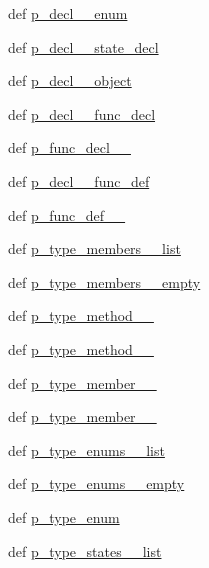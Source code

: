 \begin{DoxyCompactItemize}
def \hyperlink{classslicc_1_1parser_1_1SLICC_adcab24cfeebb754dc1256bf854e6feb7}{p\_\-decl\_\-\_\-enum}
\item 
def \hyperlink{classslicc_1_1parser_1_1SLICC_a18fd8cff26bef07652081e680b979709}{p\_\-decl\_\-\_\-state\_\-decl}
\item 
def \hyperlink{classslicc_1_1parser_1_1SLICC_ac5d6e1167568798c10875717aa01f18b}{p\_\-decl\_\-\_\-object}
\item 
def \hyperlink{classslicc_1_1parser_1_1SLICC_ad66627c6753ceb15be8ff36e20fcb0e1}{p\_\-decl\_\-\_\-func\_\-decl}
\item 
def \hyperlink{classslicc_1_1parser_1_1SLICC_afaf6fd2752bcbcfe7e4b38de1c128c99}{p\_\-func\_\-decl\_\-\_}
\item 
def \hyperlink{classslicc_1_1parser_1_1SLICC_a2f6325df13327674bd0ae4cc328bf0df}{p\_\-decl\_\-\_\-func\_\-def}
\item 
def \hyperlink{classslicc_1_1parser_1_1SLICC_a6b32df3ee60a0582f8efd9aa32d5ab60}{p\_\-func\_\-def\_\-\_}
\item 
def \hyperlink{classslicc_1_1parser_1_1SLICC_a8c3e9ea7893a66490263b229b8f1292b}{p\_\-type\_\-members\_\-\_\-list}
\item 
def \hyperlink{classslicc_1_1parser_1_1SLICC_a9184c0f6c2ca85dcd779db7b505176d2}{p\_\-type\_\-members\_\-\_\-empty}
\item 
def \hyperlink{classslicc_1_1parser_1_1SLICC_ab2ba9bf97cd7869bee363f09c4e777b3}{p\_\-type\_\-method\_\-\_}
\item 
def \hyperlink{classslicc_1_1parser_1_1SLICC_ad508836482d67540f8b3b5bba6461560}{p\_\-type\_\-method\_\-\_}
\item 
def \hyperlink{classslicc_1_1parser_1_1SLICC_ac6f9f3e8882575559628a5c9687438e6}{p\_\-type\_\-member\_\-\_}
\item 
def \hyperlink{classslicc_1_1parser_1_1SLICC_aa863c975771051b0c15dbb988b31ba83}{p\_\-type\_\-member\_\-\_}
\item 
def \hyperlink{classslicc_1_1parser_1_1SLICC_a777b7a832956d19030606b12ab13ec9a}{p\_\-type\_\-enums\_\-\_\-list}
\item 
def \hyperlink{classslicc_1_1parser_1_1SLICC_a980bb7bd9ac22437c10503b52799418c}{p\_\-type\_\-enums\_\-\_\-empty}
\item 
def \hyperlink{classslicc_1_1parser_1_1SLICC_ab484be4a5214a30ffab2a0e34dcdbca6}{p\_\-type\_\-enum}
\item 
def \hyperlink{classslicc_1_1parser_1_1SLICC_a69cd318d196bc2284d15defde25688ba}{p\_\-type\_\-states\_\-\_\-list}

\end{DoxyCompactItemize}
